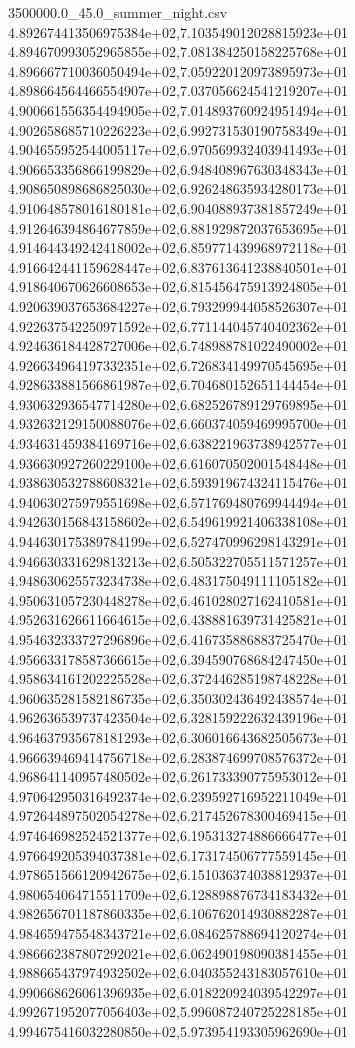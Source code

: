 \begin{filecontents*}{3500000.0_45.0_summer_night.csv}
4.892674413506975384e+02,7.103549012028815923e+01
4.894670993052965855e+02,7.081384250158225768e+01
4.896667710036050494e+02,7.059220120973895973e+01
4.898664564466554907e+02,7.037056624541219207e+01
4.900661556354494905e+02,7.014893760924951494e+01
4.902658685710226223e+02,6.992731530190758349e+01
4.904655952544005117e+02,6.970569932403941493e+01
4.906653356866199829e+02,6.948408967630348343e+01
4.908650898686825030e+02,6.926248635934280173e+01
4.910648578016180181e+02,6.904088937381857249e+01
4.912646394864677859e+02,6.881929872037653695e+01
4.914644349242418002e+02,6.859771439968972118e+01
4.916642441159628447e+02,6.837613641238840501e+01
4.918640670626608653e+02,6.815456475913924805e+01
4.920639037653684227e+02,6.793299944058526307e+01
4.922637542250971592e+02,6.771144045740402362e+01
4.924636184428727006e+02,6.748988781022490002e+01
4.926634964197332351e+02,6.726834149970545695e+01
4.928633881566861987e+02,6.704680152651144454e+01
4.930632936547714280e+02,6.682526789129769895e+01
4.932632129150088076e+02,6.660374059469995700e+01
4.934631459384169716e+02,6.638221963738942577e+01
4.936630927260229100e+02,6.616070502001548448e+01
4.938630532788608321e+02,6.593919674324115476e+01
4.940630275979551698e+02,6.571769480769944494e+01
4.942630156843158602e+02,6.549619921406338108e+01
4.944630175389784199e+02,6.527470996298143291e+01
4.946630331629813213e+02,6.505322705511571257e+01
4.948630625573234738e+02,6.483175049111105182e+01
4.950631057230448278e+02,6.461028027162410581e+01
4.952631626611664615e+02,6.438881639731425821e+01
4.954632333727296896e+02,6.416735886883725470e+01
4.956633178587366615e+02,6.394590768684247450e+01
4.958634161202225528e+02,6.372446285198748228e+01
4.960635281582186735e+02,6.350302436492438574e+01
4.962636539737423504e+02,6.328159222632439196e+01
4.964637935678181293e+02,6.306016643682505673e+01
4.966639469414756718e+02,6.283874699708576372e+01
4.968641140957480502e+02,6.261733390775953012e+01
4.970642950316492374e+02,6.239592716952211049e+01
4.972644897502054278e+02,6.217452678300469415e+01
4.974646982524521377e+02,6.195313274886666477e+01
4.976649205394037381e+02,6.173174506777559145e+01
4.978651566120942675e+02,6.151036374038812937e+01
4.980654064715511709e+02,6.128898876734183432e+01
4.982656701187860335e+02,6.106762014930882287e+01
4.984659475548343721e+02,6.084625788694120274e+01
4.986662387807292021e+02,6.062490198090381455e+01
4.988665437974932502e+02,6.040355243183057610e+01
4.990668626061396935e+02,6.018220924039542297e+01
4.992671952077056403e+02,5.996087240725228185e+01
4.994675416032280850e+02,5.973954193305962690e+01

\end{filecontents*}
